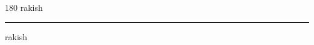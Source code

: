 
\begin{frame}
\begin{center}
\begin{turn}{180}
{\fontsize{2.5cm}{1em}\selectfont rakish}
\end{turn}
\vspace{1em}\par  
\hrule
\vspace{1em}\par  
{\fontsize{2.5cm}{1em}\selectfont rakish}
\end{center}
\end{frame}
